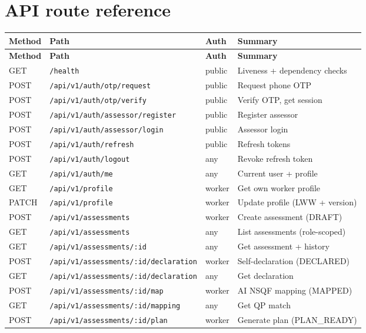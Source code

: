 \documentclass[11pt,a4paper]{article}
\newcommand{\code}[1]{\texttt{\small #1}}
\begin{document}
\section{API route reference}
\footnotesize
\begin{longtable}{L{1.15cm}L{7.7cm}L{1.95cm}L{4.5cm}}
\toprule
\textbf{Method} & \textbf{Path} & \textbf{Auth} & \textbf{Summary} \\
\midrule
\endfirsthead
\toprule
\textbf{Method} & \textbf{Path} & \textbf{Auth} & \textbf{Summary} \\
\midrule
\endhead
\bottomrule
\endlastfoot
GET & \code{/health} & public & Liveness + dependency checks \\
POST & \code{/api/v1/auth/otp/request} & public & Request phone OTP \\
POST & \code{/api/v1/auth/otp/verify} & public & Verify OTP, get session \\
POST & \code{/api/v1/auth/assessor/register} & public & Register assessor \\
POST & \code{/api/v1/auth/assessor/login} & public & Assessor login \\
POST & \code{/api/v1/auth/refresh} & public & Refresh tokens \\
POST & \code{/api/v1/auth/logout} & any & Revoke refresh token \\
GET & \code{/api/v1/auth/me} & any & Current user + profile \\
GET & \code{/api/v1/profile} & worker & Get own worker profile \\
PATCH & \code{/api/v1/profile} & worker & Update profile (LWW + version) \\
POST & \code{/api/v1/assessments} & worker & Create assessment (DRAFT) \\
GET & \code{/api/v1/assessments} & any & List assessments (role-scoped) \\
GET & \code{/api/v1/assessments/:id} & any & Get assessment + history \\
POST & \code{/api/v1/assessments/:id/declaration} & worker & Self-declaration (DECLARED) \\
GET & \code{/api/v1/assessments/:id/declaration} & any & Get declaration \\
POST & \code{/api/v1/assessments/:id/map} & worker & AI NSQF mapping (MAPPED) \\
GET & \code{/api/v1/assessments/:id/mapping} & any & Get QP match \\
POST & \code{/api/v1/assessments/:id/plan} & worker & Generate plan (PLAN\_READY) \\

\end{longtable}
\end{document}

